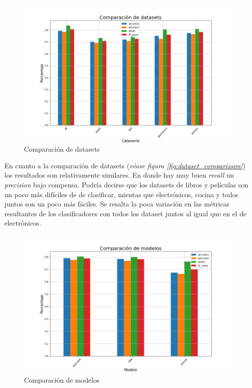 \begin{figure}[H]
    \centering
    \includegraphics[scale = 0.45]{results/datasets_comparison.png}
    \caption{Comparación de datasets}
    
\end{figure}

En cuanto a la comparación de datasets (\textit{véase figura \ref{fig:dataset_comparisson}}) los resultados son relativamente similares. En donde hay muy buen \textit{recall} un \textit{precision} bajo compensa. Podría decirse que los datasets de libros y películas son un poco más difíciles de de clasificar, mientas que electrónicos, cocina y todos juntos son un poco más fáciles. Se resalta la poca variación en las métricas resultantes de los clasificadores con todos los dataset juntos al igual que en el de electrónicos.

\begin{figure}[H]
    \centering
    \includegraphics[scale = 0.45]{results/model_comparison.png}
    \caption{Comparación de modelos}
    \label{fig:model_comparisson}
\end{figure}


